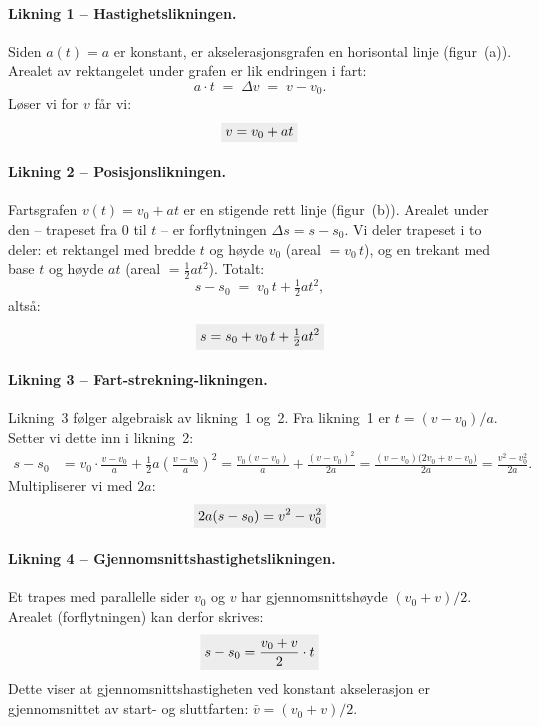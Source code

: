 \medskip

\paragraph{Likning 1 – Hastighetslikningen.}
Siden $a(t) = a$ er konstant, er akselerasjonsgrafen en horisontal linje (figur~(a)). Arealet av rektangelet under grafen er lik endringen i fart:
\[
  a \cdot t \;=\; \Delta v \;=\; v - v_0.
\]
Løser vi for $v$ får vi:
\begin{align}
  \colorbox{black!7}{$\displaystyle v = v_0 + at$}
\end{align}

\paragraph{Likning 2 – Posisjonslikningen.}
Fartsgrafen $v(t) = v_0 + at$ er en stigende rett linje (figur~(b)). Arealet under den – trapeset fra $0$ til $t$ – er forflytningen $\Delta s = s - s_0$. Vi deler trapeset i to deler: et rektangel med bredde $t$ og høyde $v_0$ (areal $= v_0\,t$), og en trekant med base $t$ og høyde $at$ (areal $= \tfrac{1}{2}at^2$). Totalt:
\[
  s - s_0 \;=\; v_0\,t + \tfrac{1}{2}at^2,
\]
altså:
\begin{align}
  \colorbox{black!7}{$\displaystyle s = s_0 + v_0\,t + \tfrac{1}{2}at^2$}
\end{align}

\paragraph{Likning 3 – Fart-strekning-likningen.}
Likning~3 følger algebraisk av likning~1 og~2. Fra likning~1 er $t = (v - v_0)/a$. Setter vi dette inn i likning~2:
\begin{align*}
  s - s_0
  &= v_0\cdot\frac{v-v_0}{a} + \tfrac{1}{2}a\left(\frac{v-v_0}{a}\right)^2
   = \frac{v_0(v-v_0)}{a} + \frac{(v-v_0)^2}{2a}
   = \frac{(v-v_0)\bigl(2v_0 + v - v_0\bigr)}{2a}
   = \frac{v^2 - v_0^2}{2a}.
\end{align*}
Multipliserer vi med $2a$:
\begin{align}
  \colorbox{black!7}{$\displaystyle 2a(s-s_0) = v^2 - v_0^2$}
\end{align}

\paragraph{Likning 4 – Gjennomsnittshastighetslikningen.}
Et trapes med parallelle sider $v_0$ og $v$ har gjennomsnittshøyde $(v_0 + v)/2$. Arealet (forflytningen) kan derfor skrives:
\begin{align}
  \colorbox{black!7}{$\displaystyle s - s_0 = \frac{v_0 + v}{2}\cdot t$}
\end{align}
Dette viser at gjennomsnittshastigheten ved konstant akselerasjon er gjennomsnittet av start- og sluttfarten: $\bar{v} = (v_0 + v)/2$.

